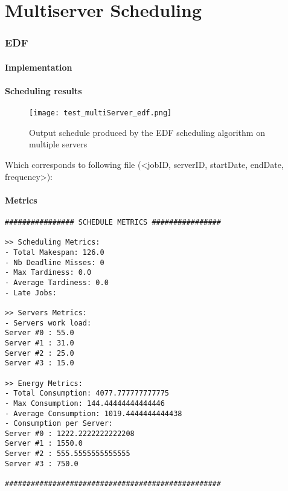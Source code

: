 \documentclass[./report.tex]{subfiles}
\begin{document}
\part{Multiserver Scheduling}

\section{EDF}
\subsection{Implementation}

\subsection{Scheduling results}
\begin{figure}[!h]
	\center
	\texttt{[image: test\_multiServer\_edf.png]}
	\caption{Output schedule produced by the EDF scheduling algorithm on multiple servers}
	\label{fig:multiServer_edf} 
\end{figure}

Which corresponds to following file (<jobID, serverID, startDate, endDate, frequency>):


\newpage
\subsection{Metrics}
\begin{lstlisting}[style=txt, caption={Metrics for EDF on multiple servers}]
################ SCHEDULE METRICS ################

>> Scheduling Metrics: 
- Total Makespan: 126.0
- Nb Deadline Misses: 0
- Max Tardiness: 0.0
- Average Tardiness: 0.0
- Late Jobs: 

>> Servers Metrics: 
- Servers work load:
Server #0 : 55.0
Server #1 : 31.0
Server #2 : 25.0
Server #3 : 15.0

>> Energy Metrics: 
- Total Consumption: 4077.777777777775
- Max Consumption: 144.44444444444446
- Average Consumption: 1019.4444444444438
- Consumption per Server: 
Server #0 : 1222.2222222222208
Server #1 : 1550.0
Server #2 : 555.5555555555555
Server #3 : 750.0

##################################################
\end{lstlisting}
\end{document}
